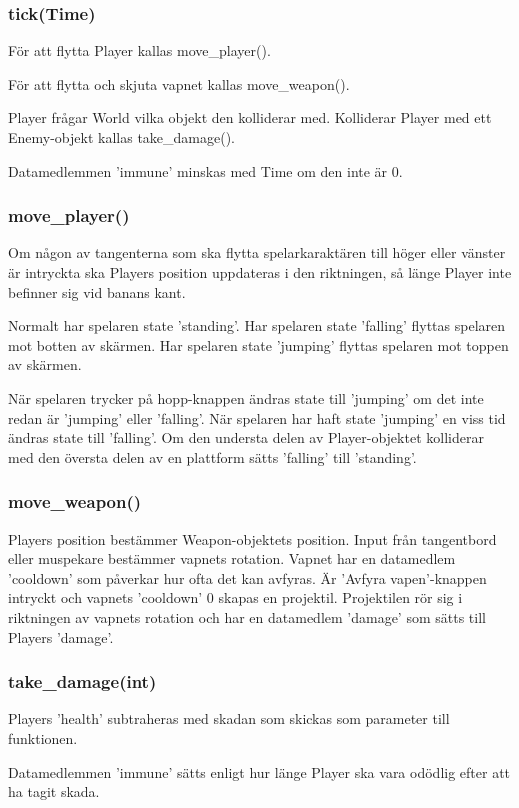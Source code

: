 \documentclass{TDP005mall}
\begin{document}
\subsubsection{tick(Time)}
För att flytta Player kallas move\_player().

För att flytta och skjuta vapnet kallas move\_weapon().

Player frågar World vilka objekt den kolliderar med. Kolliderar Player med ett Enemy-objekt kallas take\_damage().

Datamedlemmen 'immune' minskas med Time om den inte är 0.

\subsubsection{move\_player()}
Om någon av tangenterna som ska flytta spelarkaraktären till höger eller vänster är intryckta ska Players position uppdateras i den riktningen, så länge Player inte befinner sig vid banans kant.

Normalt har spelaren state 'standing'. 
Har spelaren state 'falling' flyttas spelaren mot botten av skärmen. 
Har spelaren state 'jumping' flyttas spelaren mot toppen av skärmen.

När spelaren trycker på hopp-knappen ändras state till 'jumping' om det inte redan är 'jumping' eller 'falling'.
När spelaren har haft state 'jumping' en viss tid ändras state till 'falling'.
Om den understa delen av Player-objektet kolliderar med den översta delen av en plattform sätts 'falling' till 'standing'.

\subsubsection{move\_weapon()}
Players position bestämmer Weapon-objektets position. 
Input från tangentbord eller muspekare bestämmer vapnets rotation.
Vapnet har en datamedlem 'cooldown' som påverkar hur ofta det kan avfyras. 
Är 'Avfyra vapen'-knappen intryckt och vapnets 'cooldown' 0 skapas en projektil.
Projektilen rör sig i riktningen av vapnets rotation och har en datamedlem 'damage' som sätts till Players 'damage'.

\subsubsection{take\_damage(int)}
Players 'health' subtraheras med skadan som skickas som parameter till funktionen. 

Datamedlemmen 'immune' sätts enligt hur länge Player ska vara odödlig efter att ha tagit skada.
\end{document}
